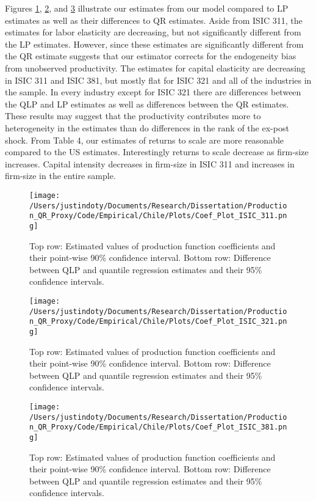 \documentclass[11pt]{article}
\begin{document}
Figures \ref{fig:CHL311}, \ref{fig:CHL321}, and \ref{fig:CHL381} illustrate our estimates from our model compared to LP estimates as well as their differences to QR estimates. Aside from ISIC 311, the estimates for labor elasticity are decreasing, but not significantly different from the LP estimates. However, since these estimates are significantly different from the QR estimate suggests that our estimator corrects for the endogeneity bias from unobserved productivity. The estimates for capital elasticity are decreasing in ISIC 311 and ISIC 381, but mostly flat for ISIC 321 and all of the industries in the sample. In every industry except for ISIC 321 there are differences between the QLP and LP estimates as well as differences between the QR estimates. These results may suggest that the productivity contributes more to heterogeneity in the estimates than do differences in the rank of the ex-post shock. From Table 4, our estimates of returns to scale are more reasonable compared to the US estimates. Interestingly returns to scale decrease as firm-size increases. Capital intensity decreases in firm-size in ISIC 311 and increases in firm-size in the entire sample.


  

\begin{figure}[H]
\centering
\texttt{[image: /Users/justindoty/Documents/Research/Dissertation/Production\_QR\_Proxy/Code/Empirical/Chile/Plots/Coef\_Plot\_ISIC\_311.png]}
\caption{Top row: Estimated values of production function coefficients and their point-wise 90\% confidence interval. Bottom row: Difference between QLP and quantile regression estimates and their 95\% confidence intervals.}
\label{fig:CHL311}
\end{figure}

\begin{figure}[H]
\centering
\texttt{[image: /Users/justindoty/Documents/Research/Dissertation/Production\_QR\_Proxy/Code/Empirical/Chile/Plots/Coef\_Plot\_ISIC\_321.png]}
\caption{Top row: Estimated values of production function coefficients and their point-wise 90\% confidence interval. Bottom row: Difference between QLP and quantile regression estimates and their 95\% confidence intervals.}
\label{fig:CHL321}
\end{figure}

\begin{figure}[H]
\centering
\texttt{[image: /Users/justindoty/Documents/Research/Dissertation/Production\_QR\_Proxy/Code/Empirical/Chile/Plots/Coef\_Plot\_ISIC\_381.png]}
\caption{Top row: Estimated values of production function coefficients and their point-wise 90\% confidence interval. Bottom row: Difference between QLP and quantile regression estimates and their 95\% confidence intervals.}
\label{fig:CHL381}
\end{figure}
\end{document}
